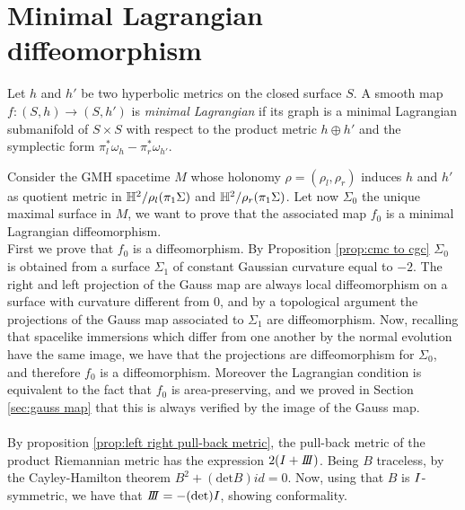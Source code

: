 \section{Minimal Lagrangian diffeomorphism}

\begin{definition}
    Let $h$ and $h'$ be two hyperbolic metrics on the closed surface $S$. A smooth map $f: (S,h) \to (S,h')$ is \textit{minimal Lagrangian} if its graph is a minimal Lagrangian submanifold of $S\times S$ with respect to the product metric $h \oplus h'$ and the symplectic form $\pi_l^*\omega_h - \pi_r^* \omega_{h'}$. 
\end{definition}

\red{|||}
Consider the GMH spacetime $M$ whose holonomy $\rho = (\rho_l, \rho_r)$ induces $h$ and $h'$ as quotient metric in $\mathbb{H}^2 / \rho_l(\pi_1 \Sigma)$ and $\mathbb{H}^2 / \rho_r(\pi_1 \Sigma)$. Let now $\Sigma_0$ the unique maximal surface in $M$, we want to prove that the associated map $f_0$ is a minimal Lagrangian diffeomorphism.\\
First we prove that $f_0$ is a diffeomorphism. By Proposition \ref{prop:cmc to cgc} $\Sigma_0$ is obtained from a surface $\Sigma_1$ of constant Gaussian curvature equal to $-2$. The right and left projection of the Gauss map are always local diffeomorphism on a surface with curvature different from $0$, and by a topological argument the projections of the Gauss map associated to $\Sigma_1$ are diffeomorphism. Now, recalling that spacelike immersions which differ from one another by the normal evolution have the same image, we have that the projections are diffeomorphism for $\Sigma_0$, and therefore $f_0$ is a diffeomorphism. Moreover the Lagrangian condition is equivalent to the fact that $f_0$ is area-preserving, and we proved in Section \ref{sec:gauss map} that this is always verified by the image of the Gauss map.\\
\\
By proposition \ref{prop:left right pull-back metric}, the pull-back metric of the product Riemannian metric has the expression $2(\I + \III)$. Being $B$ traceless, by the Cayley-Hamilton theorem $B^2 + (\text{det}B)id = 0$. Now, using that $B$ is $I$-symmetric, we have that $\III = -(\text{det})I$, showing conformality.\\

\red{|||}
